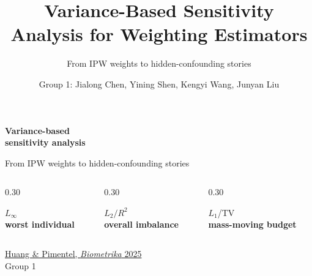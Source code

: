 \documentclass[aspectratio=169,10pt]{ctexbeamer}
\title{Variance-Based Sensitivity Analysis for Weighting Estimators}
\subtitle{From IPW weights to hidden-confounding stories}
\author[Group 1]{Group 1: Jialong Chen, Yining Shen, Kengyi Wang, Junyan Liu}
\institute{Biostatistics Final Project \textbar{} Group 1}
\date{\paperlink}
\newcommand{\paperlink}{\href{https://doi.org/10.1093/biomet/asae040}{Huang \& Pimentel, \textit{Biometrika} 2025}}
\begin{document}
\begin{frame}[plain]
  \vspace{0.65cm}
  {\Huge\bfseries\color{DeepBlue} Variance-based\\[0.08em] sensitivity analysis}

  \vspace{0.45cm}
  {\Large From IPW weights to hidden-confounding stories}

  \vspace{0.75cm}
  \begin{columns}[T,totalwidth=\textwidth]
    \begin{column}{0.30\textwidth}
      \begin{orangebox}
        \centering
        {\huge $L_\infty$}\\[0.35em]
        \textbf{worst individual}
      \end{orangebox}
    \end{column}
    \begin{column}{0.30\textwidth}
      \begin{bluebox}
        \centering
        {\huge $L_2/R^2$}\\[0.35em]
        \textbf{overall imbalance}
      \end{bluebox}
    \end{column}
    \begin{column}{0.30\textwidth}
      \begin{yellowbox}
        \centering
        {\huge $L_1$/TV}\\[0.35em]
        \textbf{mass-moving budget}
      \end{yellowbox}
    \end{column}
  \end{columns}

  \vfill
  \begin{flushright}
    \small
    \paperlink\\
    Group 1
  \end{flushright}
\end{frame}
\end{document}
